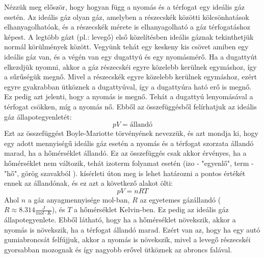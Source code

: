 \documentclass[a4paper,12pt]{article}
\begin{document}
Nézzük meg először, hogy hogyan függ a nyomás és a térfogat egy ideális gáz esetén. Az ideális gáz olyan gáz, amelyben a részecskék közötti kölcsönhatások elhanyagolhatóak,
és a részecskék mérete is elhanyagolható a gáz térfogatáshoz képest. A legtöbb gázt (pl.: levegő) első közelítésben ideális gáznak tekinthetjük normál körülmények között.
Vegyünk tehát egy keskeny kis csövet amiben egy ideális gáz van, és a végén van egy dugattyú és egy nyomásmérő. Ha a dugattyút elkezdjük nyomni, akkor a gáz részecskéi egyre közelebb kerülnek egymáshoz,
így a sűrűségük megnő. Mivel a részecskék egyre közelebb kerülnek egymáshoz, ezért egyre gyakrabban ütköznek a dugattyúval, így a dugattyúra ható erő is megnő. Ez pedig azt jelenti, hogy a nyomás is megnő.
Tehát a dugattyú lenyomásával a térfogat csökken, míg a nyomás nő. Ebből az összefüggésből felírhatjuk az ideális gáz állapotegyenletét:    
\begin{equation}
    pV = \text{állandó}
\end{equation}
Ezt az összefüggést Boyle-Mariotte törvényének nevezzük, és azt mondja ki, hogy egy adott mennyiségű ideális gáz esetén a nyomás és a térfogat szorzata állandó marad,
ha a hőmérséklet állandó. Ez az összefüggés csak akkor érvényes, ha a hőmérséklet nem változik, tehát izoterm folyamat esetén (izo - "egyenlő", term - "hő", görög szavakból ).
kísérleti úton meg is lehet határozni a pontos értékét ennek az állandónak, és ez azt a következő alakot ölti:
\begin{equation}
    pV = nRT
\end{equation}
Ahol $n$ a gáz anyagmennyisége mol-ban, $R$ az egyetemes gázállandó ($R \approx 8.314 \frac{J}{mol \cdot K}$), és $T$ a hőmérséklet Kelvin-ben. Ez pedig az ideális gáz állapotegyenlete.
Ebből látható, hogy ha a hőmérséklet növekszik, akkor a nyomás is növekszik, ha a térfogat állandó marad. Ezért van az, hogy ha egy autó gumiabroncsát felfújjuk, akkor a nyomás is növekszik,
mivel a levegő részecskéi gyorsabban mozognak és így nagyobb erővel ütköznek az abroncs falával.
\end{document}
